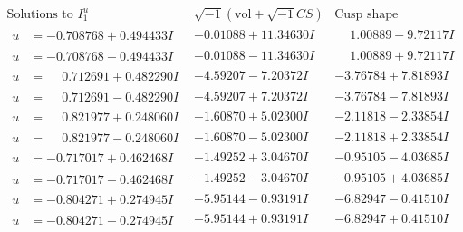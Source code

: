 \documentclass[1p]{elsarticle_modified}
\theoremstyle{definition}
\newcommand{\I}{\sqrt{-1}}
\begin{document}
$$\begin{array}{c|c|c}  
\text{Solutions to }I^u_{1}& \I (\text{vol} + \sqrt{-1}CS) & \text{Cusp shape}\\
 \hline 
\begin{aligned}
u &= -0.708768 + 0.494433 I\end{aligned}
 & -0.01088 + 11.34630 I & \phantom{-}1.00889 - 9.72117 I \\ \hline\begin{aligned}
u &= -0.708768 - 0.494433 I\end{aligned}
 & -0.01088 - 11.34630 I & \phantom{-}1.00889 + 9.72117 I \\ \hline\begin{aligned}
u &= \phantom{-}0.712691 + 0.482290 I\end{aligned}
 & -4.59207 - 7.20372 I & -3.76784 + 7.81893 I \\ \hline\begin{aligned}
u &= \phantom{-}0.712691 - 0.482290 I\end{aligned}
 & -4.59207 + 7.20372 I & -3.76784 - 7.81893 I \\ \hline\begin{aligned}
u &= \phantom{-}0.821977 + 0.248060 I\end{aligned}
 & -1.60870 + 5.02300 I & -2.11818 - 2.33854 I \\ \hline\begin{aligned}
u &= \phantom{-}0.821977 - 0.248060 I\end{aligned}
 & -1.60870 - 5.02300 I & -2.11818 + 2.33854 I \\ \hline\begin{aligned}
u &= -0.717017 + 0.462468 I\end{aligned}
 & -1.49252 + 3.04670 I & -0.95105 - 4.03685 I \\ \hline\begin{aligned}
u &= -0.717017 - 0.462468 I\end{aligned}
 & -1.49252 - 3.04670 I & -0.95105 + 4.03685 I \\ \hline\begin{aligned}
u &= -0.804271 + 0.274945 I\end{aligned}
 & -5.95144 - 0.93191 I & -6.82947 - 0.41510 I \\ \hline\begin{aligned}
u &= -0.804271 - 0.274945 I\end{aligned}
 & -5.95144 + 0.93191 I & -6.82947 + 0.41510 I \\ \hline\begin{aligned}

\end{aligned}
\end{array}$$
\end{document}
